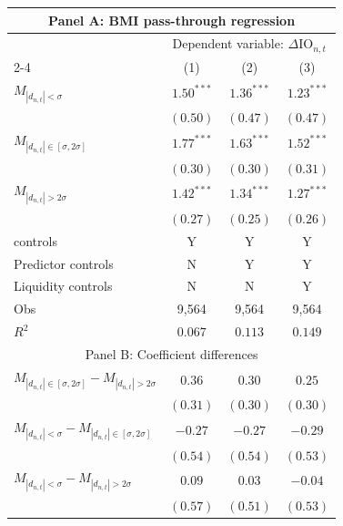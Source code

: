 \begin{tabular}{lccc}
  \hline \multicolumn{4}{c}{Panel A: BMI pass-through regression} \\
 \hline
                                    & \multicolumn{3}{c}{Dependent variable: $\Delta \text{IO}_{n,t}$} \\

                                    \cmidrule(l){2-4} 
  \vspace{5pt} & (1) & (2) & (3) \\ 
  $M_{|d_{n,t}| < \sigma}$ & $1.50^{***}$ & $1.36^{***}$ & $1.23^{***}$ \\ 
   & $(0.50)$ & $(0.47)$ & $(0.47)$ \\ 
  $M_{|d_{n,t}| \in [\sigma, 2\sigma]}$ & $1.77^{***}$ & $1.63^{***}$ & $1.52^{***}$ \\ 
   & $(0.30)$ & $(0.30)$ & $(0.31)$ \\ 
  $M_{|d_{n,t}| > 2 \sigma}$ & $1.42^{***}$ & $1.34^{***}$ & $1.27^{***}$ \\ 
   \vspace{5pt} & $(0.27)$ & $(0.25)$ & $(0.26)$ \\ 
  \citet{pavlova2023benchmarking} controls & Y & Y & Y \\ 
  Predictor controls & N & Y & Y \\ 
   \vspace{5pt}Liquidity controls & N & N & Y \\ 
  Obs & 9,564 & 9,564 & 9,564 \\ 
  $R^2$ & $0.067$ & $0.113$ & $0.149$ \\ 
   \hline \multicolumn{4}{c}{Panel B: Coefficient differences} \\
 \hline$M_{|d_{n,t}| \in [\sigma, 2\sigma]} - M_{|d_{n,t}| > 2 \sigma}$ & $0.36$ & $0.30$ & $0.25$ \\ 
   & $(0.31)$ & $(0.30)$ & $(0.30)$ \\ 
  $M_{|d_{n,t}| < \sigma} - M_{|d_{n,t}| \in [\sigma, 2\sigma]}$ & $-0.27$ & $-0.27$ & $-0.29$ \\ 
   & $(0.54)$ & $(0.54)$ & $(0.53)$ \\ 
  $M_{|d_{n,t}| < \sigma} - M_{|d_{n,t}| > 2 \sigma}$ & $0.09$ & $0.03$ & $-0.04$ \\ 
   & $(0.57)$ & $(0.51)$ & $(0.53)$ \\ 
   \hline 
\end{tabular}
